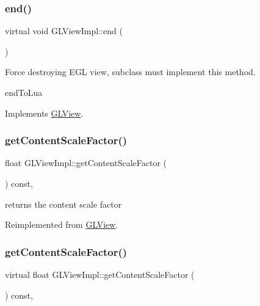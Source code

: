\subsubsection{\texorpdfstring{end()}{end()}\hspace{0.1cm}{\footnotesize\ttfamily [9/9]}}
{\footnotesize\ttfamily virtual void G\+L\+View\+Impl\+::end (\begin{DoxyParamCaption}{ }\end{DoxyParamCaption})\hspace{0.3cm}{\ttfamily [virtual]}}

Force destroying E\+GL view, subclass must implement this method.

end\+To\+Lua 

Implements \hyperlink{classGLView_aaa284e08de7b4e530a2b15b1d27dced0}{G\+L\+View}.

\mbox{\label{classGLViewImpl_a507c696f2d69451ca36ff787a996bf22}} 
\subsubsection{\texorpdfstring{get\+Content\+Scale\+Factor()}{getContentScaleFactor()}\hspace{0.1cm}{\footnotesize\ttfamily [1/2]}}
{\footnotesize\ttfamily float G\+L\+View\+Impl\+::get\+Content\+Scale\+Factor (\begin{DoxyParamCaption}{ }\end{DoxyParamCaption}) const\hspace{0.3cm}{\ttfamily [override]}, {\ttfamily [virtual]}}

returns the content scale factor 

Reimplemented from \hyperlink{classGLView_a730b2ced5ee33d2bf975eb3fffd317bf}{G\+L\+View}.

\mbox{\label{classGLViewImpl_a475f5c382360141199bf110655941a22}} 
\subsubsection{\texorpdfstring{get\+Content\+Scale\+Factor()}{getContentScaleFactor()}\hspace{0.1cm}{\footnotesize\ttfamily [2/2]}}
{\footnotesize\ttfamily virtual float G\+L\+View\+Impl\+::get\+Content\+Scale\+Factor (\begin{DoxyParamCaption}{ }\end{DoxyParamCaption}) const\hspace{0.3cm}{\ttfamily [override]}, {\ttfamily [virtual]}}

